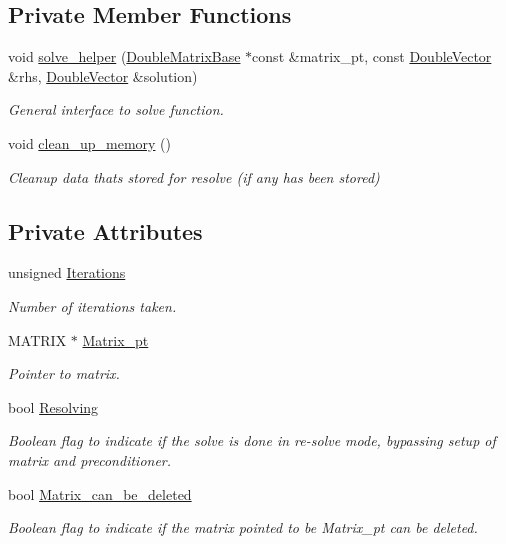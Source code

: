 \subsection*{Private Member Functions}
\begin{DoxyCompactItemize}
\item 
void \hyperlink{classoomph_1_1BiCGStab_a6e6e49eb139bbc2aedfcb6cd075de3db}{solve\+\_\+helper} (\hyperlink{classoomph_1_1DoubleMatrixBase}{Double\+Matrix\+Base} $\ast$const \&matrix\+\_\+pt, const \hyperlink{classoomph_1_1DoubleVector}{Double\+Vector} \&rhs, \hyperlink{classoomph_1_1DoubleVector}{Double\+Vector} \&solution)
\begin{DoxyCompactList}\small\item\em General interface to solve function. \end{DoxyCompactList}\item 
void \hyperlink{classoomph_1_1BiCGStab_a6c97b794a4bec6a22df28f5f160577be}{clean\+\_\+up\+\_\+memory} ()
\begin{DoxyCompactList}\small\item\em Cleanup data that\textquotesingle{}s stored for resolve (if any has been stored) \end{DoxyCompactList}\end{DoxyCompactItemize}
\subsection*{Private Attributes}
\begin{DoxyCompactItemize}
\item 
unsigned \hyperlink{classoomph_1_1BiCGStab_a6f7e515c8dd64b1f3cc65e021abcbdca}{Iterations}
\begin{DoxyCompactList}\small\item\em Number of iterations taken. \end{DoxyCompactList}\item 
M\+A\+T\+R\+IX $\ast$ \hyperlink{classoomph_1_1BiCGStab_a618f4b5ef6a92b4a7163986f40b62f18}{Matrix\+\_\+pt}
\begin{DoxyCompactList}\small\item\em Pointer to matrix. \end{DoxyCompactList}\item 
bool \hyperlink{classoomph_1_1BiCGStab_aa50a58f59ddf74c0c902dd7769b11498}{Resolving}
\begin{DoxyCompactList}\small\item\em Boolean flag to indicate if the solve is done in re-\/solve mode, bypassing setup of matrix and preconditioner. \end{DoxyCompactList}\item 
bool \hyperlink{classoomph_1_1BiCGStab_a4314b4e4044e111412b5c0150250829f}{Matrix\+\_\+can\+\_\+be\+\_\+deleted}
\begin{DoxyCompactList}\small\item\em Boolean flag to indicate if the matrix pointed to be Matrix\+\_\+pt can be deleted. \end{DoxyCompactList}\end{DoxyCompactItemize}
